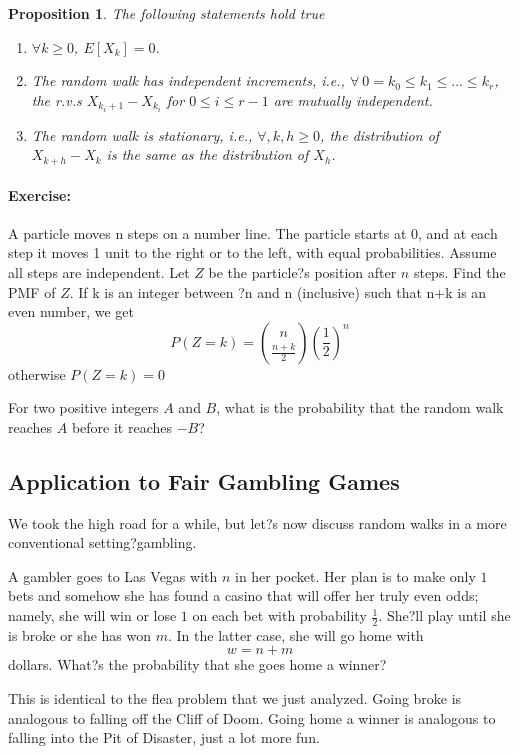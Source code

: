 \documentclass[12pt,a4paper]{article}
\newtheorem{proposition}{Proposition}
\begin{document}
\begin{proposition}
	The following statements hold true
	\begin{enumerate}
	\item $\forall k\geq 0, \ E[X_k] = 0$.
	\item The random walk has independent increments, i.e., $\forall\ 0 = k_0 \leq k_1 \leq\ldots\leq k_r$, the r.v.s $X_{k_i+1}-X_{k_i}$ for $0 \leq i \leq r-1$ are mutually independent.
	\item The random walk is stationary, i.e., $\forall, k,h\geq 0$, the distribution of $X_{k+h}-X_k$ is the same as the distribution of $X_h$.	
	\end{enumerate}
	\end{proposition}
	
\paragraph{Exercise:} A particle moves n steps on a number line. 
	The particle starts at 0, and at each step it moves 1 unit to the right or to the left, with equal probabilities. 
	Assume all steps are independent. 
	Let $Z$ be the particle?s position after $n$ steps. Find the PMF of $Z$. If k is an integer between ?n and n (inclusive) such that n+k is an even number, we get
	$$ P(Z = k) = \binom{n}{\frac{n+k}{2}}\left(\frac{1}{2}\right)^n$$
	otherwise $ P(Z = k) = 0$
	
	For two positive integers $A$ and $B$, what is the probability that the random walk reaches $A$ before it reaches $-B$?
	
		
		\subsection{Application to Fair Gambling Games}
		
		We took the high road for a while, but let?s now discuss random walks in a more conventional setting?gambling.
		
		A gambler goes to Las Vegas with $n$ in her pocket. 
		Her plan is to make only $1$ bets and somehow she has found a casino that will offer her truly even odds; namely, she will win or lose $1$ on each bet with probability $\frac{1}{2}$. She?ll play until she is broke or she has won $m$. In the latter case, she will go home with
		\[
		w = n + m
		\]
		dollars. What?s the probability that she goes home a winner?
		
		This is identical to the flea problem that we just analyzed. Going broke is analogous to falling off the Cliff of Doom. Going home a winner is analogous to falling into the Pit of Disaster, just a lot more fun.
		
\end{document}
